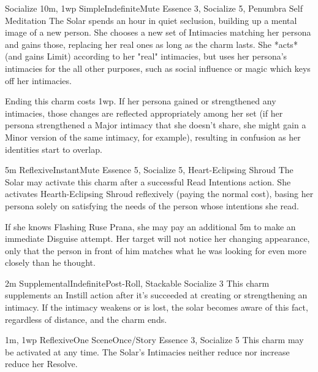 \begin{Ability}{Socialize}
  {10m, 1wp}
  {Simple}{Indefinite}{Mute}
  {Essence 3, Socialize 5, Penumbra Self Meditation}
  The Solar spends an hour in quiet seclusion, building up a mental image of a new person. She chooses a new set of Intimacies matching her persona and gains those, replacing her real ones as long as the charm lasts. She *acts* (and gains Limit) according to her "real" intimacies, but uses her persona's intimacies for the all other purposes, such as social influence or magic which keys off her intimacies.

  Ending this charm costs 1wp. If her persona gained or strengthened any intimacies, those changes are reflected appropriately among her set (if her persona strengthened a Major intimacy that she doesn't share, she might gain a Minor version of the same intimacy, for example), resulting in confusion as her identities start to overlap.

  {5m}
  {Reflexive}{Instant}{Mute}
  {Essence 5, Socialize 5, Heart-Eclipsing Shroud}
  The Solar may activate this charm after a successful Read Intentions action. She activates Hearth-Eclipsing Shroud reflexively (paying the normal cost), basing her persona solely on satisfying the needs of the person whose intentions she read.

  If she knows Flashing Ruse Prana, she may pay an additional 5m to make an immediate Disguise attempt. Her target will not notice her changing appearance, only that the person in front of him matches what he was looking for even more closely than he thought.

  {2m}
  {Supplemental}{Indefinite}{Post-Roll, Stackable}
  {Socialize 3}
  This charm supplements an Instill action after it's succeeded at creating or strengthening an intimacy. If the intimacy weakens or is lost, the solar becomes aware of this fact, regardless of distance, and the charm ends.

  {1m, 1wp}
  {Reflexive}{One Scene}{Once/Story}
  {Essence 3, Socialize 5}
  This charm may be activated at any time. The Solar's Intimacies neither reduce nor increase reduce her Resolve.

\end{Ability}

